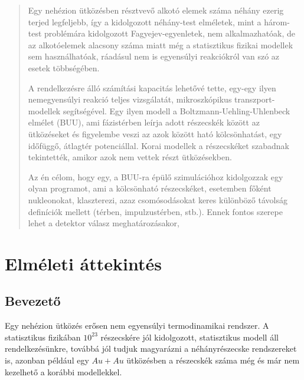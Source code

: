 \documentclass[a4paper,12pt]{article}
\begin{document}
\begin{abstract}
\par Egy nehézion ütközésben résztvevő alkotó elemek száma néhány ezerig terjed legfeljebb, így a kidolgozott néhány-test elméletek, mint a három-test problémára kidolgozott Fagyejev-egyenletek, nem alkalmazhatóak, de az alkotóelemek alacsony száma miatt még a statisztikus fizikai modellek sem használhatóak, ráadásul nem is egyensúlyi reakciókról van szó az esetek többségében.
\vspace{5mm}
\par A rendelkezésre álló számítási kapacitás lehetővé tette, egy-egy ilyen nemegyensúlyi reakció teljes vizsgálatát, mikroszkópikus transzport-modellek segítségével. Egy ilyen modell a Boltzmann-Uehling-Uhlenbeck elmélet (BUU), ami fázistérben leírja adott részecskék között az ütközéseket és figyelembe veszi az azok között ható kölcsönhatást, egy időfüggő, átlagtér potenciállal. Korai modellek a részecskéket szabadnak tekintették, amikor azok nem vettek részt ütközésekben.
\vspace{5mm}
\par Az én célom, hogy egy, a BUU-ra épülő szimulációhoz kidolgozzak egy olyan programot, ami a kölcsönható részecskéket, esetemben főként nukleonokat, klaszterezi, azaz csomósodásokat keres különböző távolság definíciók mellett (térben, impulzustérben, stb.). Ennek fontos szerepe lehet a detektor válasz meghatározásakor, 
\end{abstract}

\vfill

\newpage
\tableofcontents
\newpage

\section{Elméleti áttekintés}

\subsection{Bevezető}

\par Egy nehézion ütközés erősen nem egyensúlyi termodinamikai rendszer. A statisztikus fizikában $10^{23}$ részecskére jól kidolgozott, statisztikus modell áll rendelkezésünkre, továbbá jól tudjuk magyarázni a néhányrészecske rendszereket is, azonban például egy $Au+Au$ ütközésben a részecskék száma még és már nem kezelhető a korábbi modellekkel.

\vspace{5mm}
\end{document}
